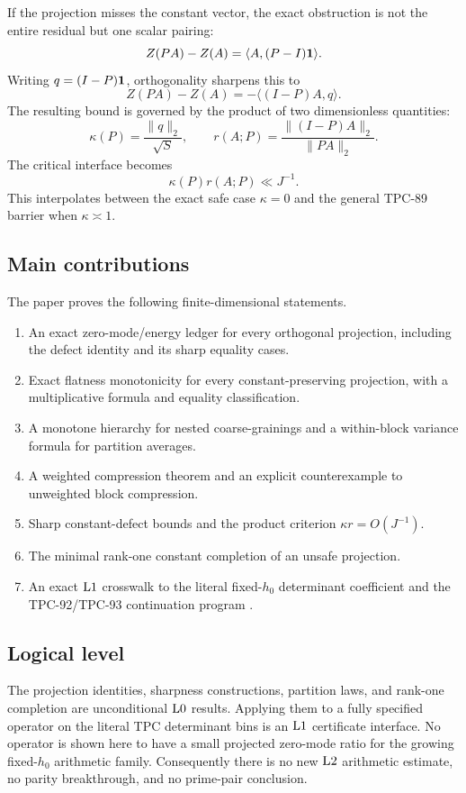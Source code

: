 If the projection misses the constant vector, the exact obstruction
is not the entire residual but one scalar pairing:
\[
 Z(PA)-Z(A)
 =
 \langle A,(P-I)\mathbf 1\rangle.
\]
Writing \(q=(I-P)\mathbf 1\), orthogonality sharpens this to
\[
 Z(PA)-Z(A)=-\langle (I-P)A,q\rangle.
\]
The resulting bound is governed by the product of two dimensionless
quantities:
\[
 \kappa(P)
 =\frac{\|q\|_2}{\sqrt S},
\qquad
 r(A;P)
 =\frac{\|(I-P)A\|_2}{\|PA\|_2}.
\]
The critical interface becomes
\[
 \kappa(P)r(A;P)\ll J^{-1}.
\]
This interpolates between the exact safe case \(\kappa=0\) and the
general TPC-89 barrier when \(\kappa\asymp1\).

\subsection{Main contributions}

The paper proves the following finite-dimensional statements.

\begin{enumerate}[label=(\arabic*),leftmargin=2.2em]
\item An exact zero-mode/energy ledger for every orthogonal
  projection, including the defect identity and its sharp equality
  cases.
\item Exact flatness monotonicity for every constant-preserving
  projection, with a multiplicative formula and equality
  classification.
\item A monotone hierarchy for nested coarse-grainings and a
  within-block variance formula for partition averages.
\item A weighted compression theorem and an explicit counterexample
  to unweighted block compression.
\item Sharp constant-defect bounds and the product criterion
  \(\kappa r=O(J^{-1})\).
\item The minimal rank-one constant completion of an unsafe
  projection.
\item An exact \(\mathrm{L1}\) crosswalk to the literal fixed-\(h_0\)
  determinant coefficient and the TPC-92/TPC-93 continuation
  program \citep{WangTPC92,WangTPC93}.
\end{enumerate}

\subsection{Logical level}

The projection identities, sharpness constructions, partition laws,
and rank-one completion are unconditional \(\mathrm{L0}\) results.
Applying them to a fully specified operator on the literal
TPC determinant bins is an \(\mathrm{L1}\) certificate interface.  No
operator is shown here to have a small projected zero-mode ratio for
the growing fixed-\(h_0\) arithmetic family.  Consequently there is
no new \(\mathrm{L2}\) arithmetic estimate, no parity breakthrough, and no
prime-pair conclusion.

